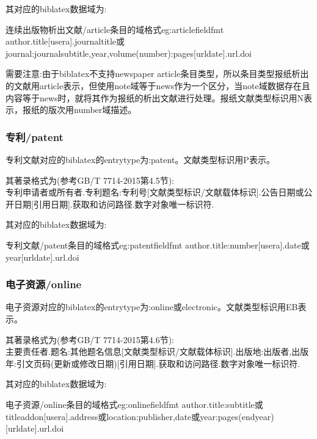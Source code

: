 其对应的biblatex数据域为:
\begin{codetex}{连续出版物析出文献/article条目的域格式}{eg:articlefieldfmt}
author.title[usera].journaltitle或journal:journalsubtitle,year,volume(number):pages[urldate].url.doi
\end{codetex}

需要注意:由于biblatex不支持newspaper article条目类型，所以条目类型报纸析出的文献用article表示，但使用note域等于news作为一个区分，当note域数据存在且内容等于news时，就将其作为报纸的析出文献进行处理。报纸文献类型标识用N表示，报纸的版次用number域描述。

\subsubsection{专利/patent}
\begin{refentry}{}{}
专利文献对应的biblatex的entrytype为:patent。文献类型标识用P表示。

其著录格式为(参考GB/T 7714-2015第4.5节):\\
专利申请者或所有者.专利题名:专利号[文献类型标识/文献载体标识].公告日期或公开日期[引用日期].获取和访问路径.数字对象唯一标识符.
\end{refentry}

其对应的biblatex数据域为:
\begin{codetex}{专利文献/patent条目的域格式}{eg:patentfieldfmt}
author.title:number[usera].date或year[urldate].url.doi
\end{codetex}

\subsubsection{电子资源/online}
\begin{refentry}{}{}
电子资源对应的biblatex的entrytype为:online或electronic。文献类型标识用EB表示。

其著录格式为(参考GB/T 7714-2015第4.6节):\\
主要责任者.题名:其他题名信息[文献类型标识/文献载体标识].出版地:出版者,出版年:引文页码(更新或修改日期)[引用日期].获取和访问路径.数字对象唯一标识符.
\end{refentry}

其对应的biblatex数据域为:
\begin{codetex}{电子资源/online条目的域格式}{eg:onlinefieldfmt}
author.title:subtitle或titleaddon[usera].address或location:publisher,date或year:pages(endyear)[urldate].url.doi
\end{codetex}

